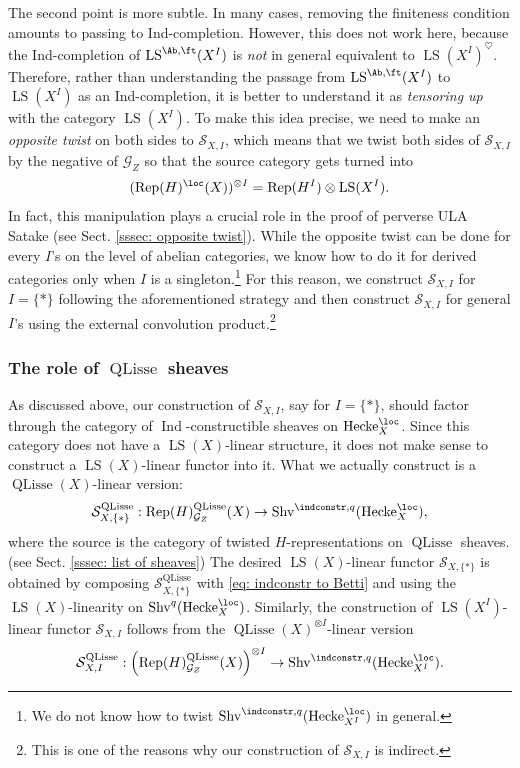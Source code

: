 \documentclass[10pt]{amsart}
\newcommand{\sssec}{\subsubsection}
\theoremstyle{remark}
\newcommand{\on}{\operatorname}
\newcommand{\cG}{\mathcal{G}}
\newcommand{\cS}{\mathcal{S}}
\newcommand{\Rep}{\on{Rep}}
\newcommand{\Shv}{\on{Shv}}
\newcommand{\LS}{\on{LS}}
\newcommand{\QLisse}{\on{QLisse}}
\DeclareMathOperator{\Ind}{Ind}
\newcommand{\Hecke}{\on{Hecke}}
\begin{document}
The second point is more subtle. In many cases, removing the finiteness condition amounts to passing to Ind-completion. However, this does not work here, because the Ind-completion of $\LS^{\Ab,\ft}(X^I)$ is \emph{not} in general equivalent to $\LS(X^I)^{\heartsuit}$. Therefore, rather than understanding the passage from $\LS^{\Ab,\ft}(X^I)$ to $\LS(X^I)$ as an Ind-completion, it is better to understand it as \emph{tensoring up} with the category $\LS(X^I)$. To make this idea precise, we need to make an \emph{opposite twist} on both sides to $\cS_{X,I}$, which means that we twist both sides of $\cS_{X,I}$ by the negative of $\cG_Z$ so that the source category gets turned into 
\[(\Rep(H)^{\loc}(X))^{\otimes I}=\Rep(H^I)\otimes \LS(X^I).\]
In fact, this manipulation plays a crucial role in the proof of perverse ULA Satake (see Sect. \ref{sssec: opposite twist}). While the opposite twist can be done for every $I$'s on the level of abelian categories, we know how to do it for derived categories only when $I$ is a singleton.\footnote{We do not know how to twist $\Shv^{\indconstr,q}(\Hecke^{\loc}_{X^I})$ in general.} For this reason, we construct $\cS_{X,I}$ for $I=\{*\}$ following the aforementioned strategy and then construct $\cS_{X,I}$ for general $I$'s using the external convolution product.\footnote{This is one of the reasons why our construction of $\cS_{X,I}$ is indirect.}

\sssec{The role of $\QLisse$ sheaves}
As discussed above, our construction of $\cS_{X,I}$, say for $I=\{*\}$, should factor through the category of $\Ind$-constructible sheaves on $\Hecke^{\loc}_{X}$. Since this category does not have a $\LS(X)$-linear structure, it does not make sense to construct a $\LS(X)$-linear functor into it. What we actually construct is a $\QLisse(X)$-linear version:
\[\cS^{\QLisse}_{X,\{*\}}:\Rep(H)^{\QLisse}_{\cG_Z}(X)\rightarrow \Shv^{\indconstr,q}(\Hecke^{\loc}_{X}),\]
where the source is the category of twisted $H$-representations on $\QLisse$ sheaves. (see Sect. \ref{sssec: list of sheaves}) The desired $\LS(X)$-linear functor $\cS_{X,\{*\}}$ is obtained by composing $\cS^{\QLisse}_{X,\{*\}}$ with \eqref{eq: indconstr to Betti} and using the $\LS(X)$-linearity on $\Shv^q(\Hecke^{\loc}_X)$. Similarly, the construction of $\LS(X^I)$-linear functor $\cS_{X,I}$ follows from the $\QLisse(X)^{\otimes I}$-linear version
\[\cS^{\QLisse}_{X,I}: \left(\Rep(H)^{\QLisse}_{\cG_Z}(X)\right)^{\otimes I}\rightarrow \Shv^{\indconstr,q}(\Hecke^{\loc}_{X^I}).\]
\end{document}

